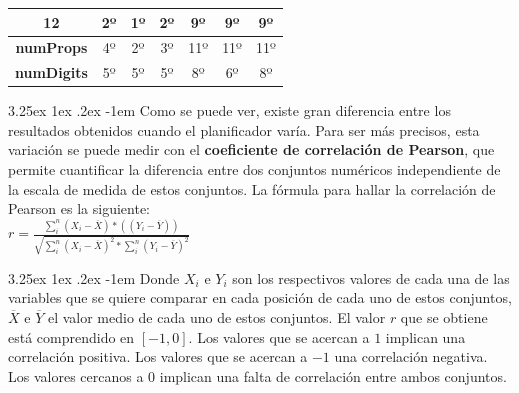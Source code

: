 \documentclass{article}
\makeatletter
\renewcommand\paragraph{\@startsection{paragraph}{5}{\z@}%
      {3.25ex \@plus1ex \@minus.2ex}%
      {-1em}%
      {\normalfont\normalsize\bfseries}}
\makeatother
\begin{document}
\begin{landscape}
\begin{table}[]
\begin{tabular}{|c|c|c|c|c|c|c|}
    \textbf{12}        & 2º                         & 1º                          & 2º                        & 9º                            & 9º                             & 9º                           \\ \hline
    \textbf{numProps}  & 4º                         & 2º                          & 3º                        & 11º                           & 11º                            & 11º                          \\ \hline
    \textbf{numDigits} & 5º                         & 5º                          & 5º                        & 8º                            & 6º                             & 8º                           \\ \hline
    \end{tabular}
    \end{table}
    \end{landscape}
    
    \paragraph{}
    Como se puede ver, existe gran diferencia entre los resultados obtenidos cuando el planificador varía. Para ser más precisos, esta variación se puede medir con el \textbf{coeficiente de correlación de Pearson}, que permite cuantificar la diferencia entre dos conjuntos numéricos independiente de la escala de medida de estos conjuntos. La fórmula para hallar la correlación de Pearson es la siguiente: \\
    
    $r = \frac{\sum_{i}^n(X_i - \overline{X})*((Y_i - \overline{Y}))}{\sqrt{\sum_i^n(X_i - \overline{X})^2 * \sum_i^n(Y_i - \overline{Y})^2}}$
    
    \paragraph{}
    Donde $X_i$ e $Y_i$ son los respectivos valores de cada una de las variables que se quiere comparar en cada posición de cada uno de estos conjuntos, $\overline{X}$ e $\overline{Y}$ el valor medio de cada uno de estos conjuntos. El valor $r$ que se obtiene está comprendido en $[-1, 0]$. Los valores que se acercan a $1$ implican una correlación positiva. Los valores que se acercan a $-1$ una correlación negativa. Los valores cercanos a $0$ implican una falta de correlación entre ambos conjuntos.
    
\end{document}
